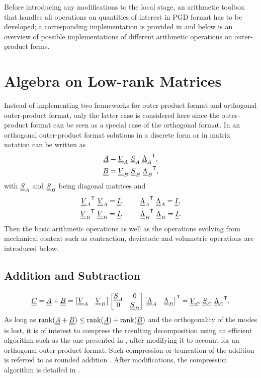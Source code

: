 Before introducing any modifications to the local stage, an arithmetic toolbox that handles all operations on quantities of interest in PGD format has to be developed; a corresponding implementation is provided in \parencite{romfem} and below is an overview of possible implementations of different arithmetic operations on outer-product forms.

\section{Algebra on Low-rank Matrices}
Instead of implementing two frameworks for outer-product format and orthogonal outer-product format, only the latter case is considered here since the outer-product format can be seen as a special case of the orthogonal format. In an orthogonal outer-product format solutions in a discrete form or in matrix notation can be written as
\begin{equation}
	\begin{split}
		\underline{\underline{A}} &= \underline{\underline{V}}_A \ \underline{\underline{S}}_A \ {\underline{\underline{\Lambda}}_A}^{\sf T},\\
		\underline{\underline{B}} &= \underline{\underline{V}}_B \ \underline{\underline{S}}_B \ {\underline{\underline{\Lambda}}_B}^{\sf T},
	\end{split}
\end{equation}
with $\underline{\underline{S}}_A$ and $\underline{\underline{S}}_B$ being diagonal matrices and
\begin{equation}
	\begin{split}
		\T{\mV_A} \ \mV_A &= \mI, \qquad \ \T{\mLambda_A} \ \mLambda_A = \mI,\\
		\T{\mV_B} \ \mV_B &= \mI, \qquad \ \T{\mLambda_B} \ \mLambda_B = \mI.
	\end{split}
\end{equation}
Then the basic arithmetic operations as well as the operations evolving from mechanical context such as contraction, deviatoric and volumetric operations are introduced below.

\subsection{Addition and Subtraction}
\begin{equation}
	\underline{\underline{C}} = \underline{\underline{A}} + \underline{\underline{B}} =
	\begin{bmatrix}
		\underline{\underline{V}}_A & \underline{\underline{V}}_B
	\end{bmatrix} \begin{bmatrix}
		\underline{\underline{S}}_A & 0     \\
		0     & \underline{\underline{S}}_B
	\end{bmatrix} {\begin{bmatrix}
			\underline{\underline{\Lambda}}_A & \underline{\underline{\Lambda}}_B
		\end{bmatrix}}^{\sf T}=\underline{\underline{V}}_C \ \underline{\underline{S}}_C \ {\underline{\underline{\Lambda}}_C}^{\sf T}.
\end{equation}
As long as ${\rm rank}(\underline{\underline{A}}+\underline{\underline{B}}) \leq {\rm rank}(\underline{\underline{A}}) + {\rm rank}(\underline{\underline{B}})$ and the orthogonality of the modes is lost, it is of interest to compress the resulting decomposition using an efficient algorithm such as the one presented in , after modifying it to account for an orthogonal outer-product format. Such compression or truncation of the addition is referred to as rounded addition \parencite{Bebendorf2008}. After modifications, the compression algorithm is detailed in .

